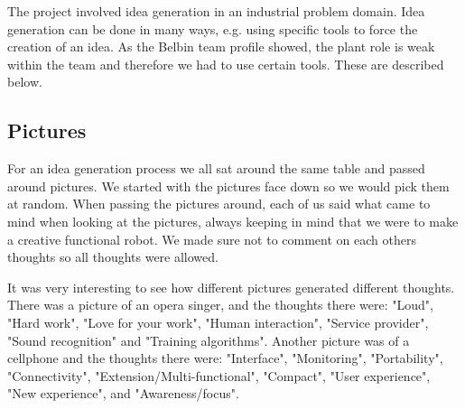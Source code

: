 The project involved idea generation in an industrial problem domain. Idea generation can be done in many ways, e.g. using specific tools to force the creation of an idea. As the Belbin team profile showed, the plant role is weak within the team and therefore we had to use certain tools. These are described below.

\subsection{Pictures}
 
\label{sec:pictures}
For an idea generation process we all sat around the same table and passed around pictures. We started with the pictures face down so we would pick them at random. When passing the pictures around, each of us said what came to mind when looking at the pictures, always keeping in mind that we were to make a creative functional robot. We made sure not to comment on each others thoughts so all thoughts were allowed. 

It was very interesting to see how different pictures generated different thoughts. There was a picture of an opera singer, and the thoughts there were: "Loud", "Hard work", "Love for your work", "Human interaction", "Service provider", "Sound recognition" and "Training algorithms". 
Another picture was of a cellphone and the thoughts there were: "Interface", "Monitoring", "Portability", "Connectivity", "Extension/Multi-functional", "Compact", "User experience", "New experience", and "Awareness/focus". 

